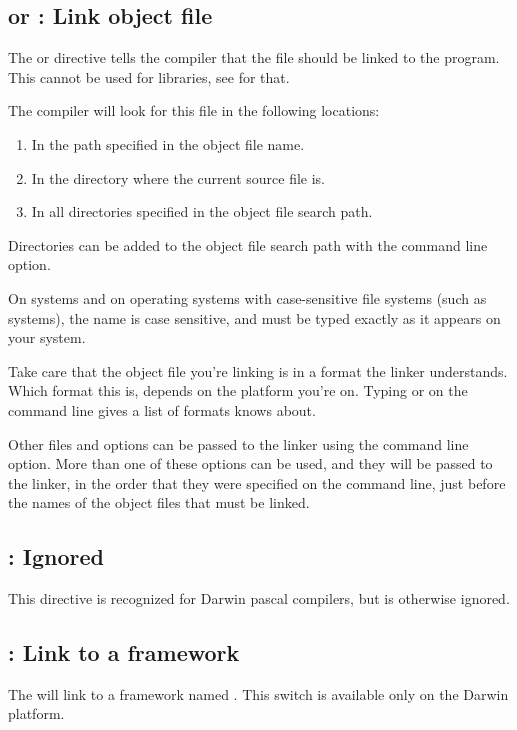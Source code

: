 \subsection{ or  : Link object file}

The  or  directive
tells the compiler that the file  should be linked to
the program. This cannot be used for libraries, see  for that.

The compiler will look for this file in the following locations:
\begin{enumerate}
\item In the path specified in the object file name.
\item In the directory where the current source file is.
\item In all directories specified in the object file search path.
\end{enumerate}
Directories can be added to the object file search path with the 
command line option.

On \linux systems and on operating systems with case-sensitive file systems
(such as \unix systems), the name is case sensitive, and must be typed
exactly as it appears on your system.

\begin{remark}Take care that the object file you're linking is in a
format the linker understands. Which format this is, depends on the platform
you're on. Typing  or  on the command line gives a list of formats
 knows about.
\end{remark}

Other files and options can be passed to the linker using the 
command line option. More than one of these options can be used, and
they will be passed to the linker, in the order that they were specified on
the command line, just before the names of the object files that must be
linked.

\subsection{ : Ignored}
This directive is recognized for Darwin pascal compilers, but is otherwise
ignored.

\subsection{ : Link to a framework}
The  will link to a framework named
. This switch is available only on the Darwin platform.

